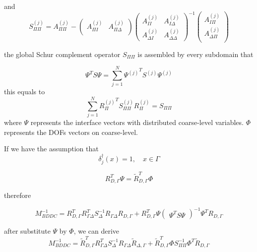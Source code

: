  and 
 \begin{equation}
 S_{\Pi \Pi}^{(j)} = A_{\Pi \Pi}^{(j)} - \begin{pmatrix}
 A_{\Pi I}^{(j)} & A_{\Pi \Delta}^{(j)} \\
 \end{pmatrix} \begin{pmatrix}
 A_{II}^{(j)} & A_{I \Delta}^{(j)} \\
 A_{\Delta I}^{(j)} & A_{\Delta \Delta}^{(j)}
 \end{pmatrix}^{-1} \begin{pmatrix}
 A_{I \Pi}^{(j)} \\ A_{\Delta \Pi}^{(j)}\\
 \end{pmatrix}
 \end{equation}
 
 the global Schur complement operator $ S_{\Pi \Pi} $ is assembled by every subdomain that
 
 \begin{equation}
 \Psi^{T} S \Psi = \sum_{j = 1}^{N} {\Psi^{(j)}}^{T} S^{(j)} \Psi^{(j)} 
 \end{equation}
 this equals to 
 \begin{equation}
 \sum_{j = 1}^{N} {R_{\Pi}^{(j)}}^{T} S_{\Pi \Pi}^{(j)} R_{\Pi}^{(j)} = S_{\Pi\Pi}
 \end{equation}
 where $ \Psi $ represents the interface vectors with distributed coarse-level variables. $ \Phi $ represents the DOFs vectors on coarse-level.
 
 If we have the assumption that
 \begin{equation}
 \delta^{\dagger}_{j} (x) = 1, \quad x \in \Gamma
 \end{equation}
 
\begin{equation}
R_{D, \Gamma}^{T} \Psi = \tilde{R}_{D, \Gamma}^{T} \Phi
\end{equation}

therefore

\begin{equation}
M_{BDDC}^{-1} = R_{D, \Gamma}^{T} R_{\Gamma \Delta}^{T} S_{\Delta}^{-1} R_{\Gamma \Delta} R_{D, \Gamma} + R_{D, \Gamma}^{T} \Psi 
\begin{pmatrix}
\Psi^{T} S \Psi
\end{pmatrix}^{-1} \Psi^{T} R_{D, \Gamma}
\end{equation}

after substitute $ \Psi $ by $ \Phi $, we can derive
\begin{equation}
M_{BDDC}^{-1} = \tilde{R}_{D, \Gamma}^{T} R_{\Gamma \Delta}^{T} S_{\Delta}^{-1} R_{\Gamma \Delta} \tilde{R}_{\Delta, \Gamma} + \tilde{R}_{D, \Gamma}^{T} \Phi S_{\Pi \Pi}^{-1} \Phi^{T} \tilde{R}_{D, \Gamma}
\end{equation}

